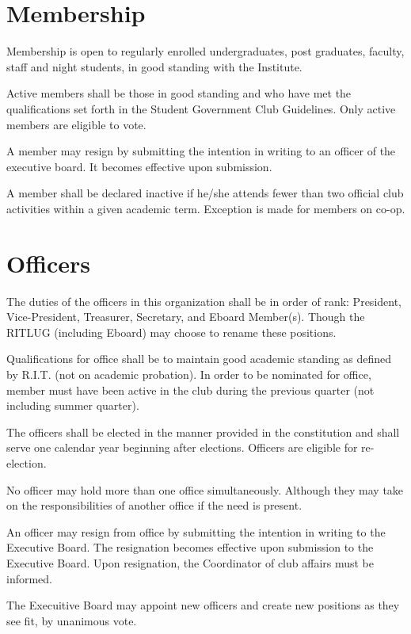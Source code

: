 \section{Membership}
\begin{subroutines}
\item Membership is open to regularly enrolled undergraduates, post graduates, faculty, staff and night students, in good standing with the Institute.
\item Active members shall be those in good standing and who have met the qualifications set forth in the Student Government Club Guidelines. Only active members are eligible to vote.
\item A member may resign by submitting the intention in writing to an officer of the executive board. It becomes effective upon submission.
\item A member shall be declared inactive if he/she attends fewer than two official club activities within a given academic term. Exception is made for members on co-op.
\end{subroutines}

\section{Officers}
\begin{subroutines}
\item The duties of the officers in this organization shall be in order of rank: President, Vice-President, Treasurer, Secretary, and Eboard Member(s). Though the RITLUG (including Eboard) may choose to rename these positions.
\item Qualifications for office shall be to maintain good academic standing as defined by R.I.T. (not on academic probation).  In order to be nominated for office, member must have been active in the club during the previous quarter (not including summer quarter).
\item The officers shall be elected in the manner provided in the constitution and shall serve one calendar year beginning after elections.  Officers are eligible for re-election.
\item No officer may hold more than one office simultaneously. Although they may take on the responsibilities of another office if the need is present.
\item An officer may resign from office by submitting the intention in writing to the Executive Board.  The resignation becomes effective upon submission to the Executive Board.  Upon resignation, the Coordinator of club affairs must be informed.
\item The Execuitive Board may appoint new officers and create new positions as they see fit, by unanimous vote.
\end{subroutines}

